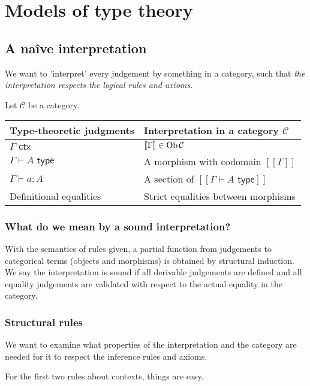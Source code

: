 \section{Models of type theory}
\subsection{A naîve interpretation}
We want to 'interpret' every judgement by something in a category, such that \textit{the interpretation respects the logical rules and axioms}.

Let $\mathcal C$ be a category.

\begin{table}[h]
    \centering 
    \begin{tabular}{|l|l|}
    \hline
    Type-theoretic judgments         & Interpretation in a category $\mathcal C$ \\ \hline
    $\Gamma \textsf{ ctx}$           & $[\![\Gamma]\!] \in \operatorname{Ob}\mathcal C$        \\  
    $\Gamma \vdash A \textsf{ type}$ & A morphism with codomain $[\![\Gamma]\!]$   \\  
    $\Gamma \vdash a: A$             & A section of  $[\![\Gamma \vdash A \textsf{ type}]\!]$  \\  
    Definitional equalities          & Strict equalities between morphisms       \\ \hline
    \end{tabular}
\end{table}

\subsubsection*{What do we mean by a sound interpretation?}

With the semantics of rules given, a partial function from judgements to categorical terms (objects and morphisms) is obtained by structural induction. We say the interpretation is sound if all derivable judgements are defined and all equality judgements are validated with respect to the actual equality in the category.

\subsubsection*{Structural rules}
We want to examine what properties of the interpretation and the category are needed for it to respect the inference rules and axioms.

For the first two rules about contexts, things are easy.

